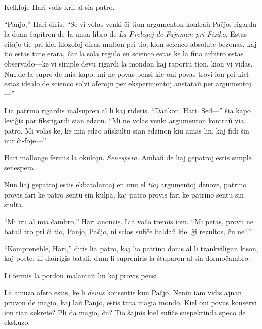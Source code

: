 Kelkfoje Hari volis krii al sia patro.

“Panjo,” Hari diris.
“Se vi volas venki ĉi tiun argumenton kontraŭ Paĉjo, rigardu la duan ĉapitron de la unua libro de \emph{La Prelegoj de Fajnman pri Fiziko}.
Estas citaĵo tie pri kiel filozofoj diras multon pri tio, kion scienco absolute bezonas, kaj tio estas tute erara, ĉar la sola regulo en scienco estas ke la fina arbitro estas observado—ke vi simple devu rigardi la mondon kaj raportu tion, kion vi vidas.
Nu…de la supro de mia kapo, mi ne povas pensi kie oni povas trovi ion pri kiel estas idealo de scienco solvi aferojn per eksperimentoj anstataŭ per argumentoj—”

Lia patrino rigardis malsupren al li kaj ridetis.
“Dankon, Hari.
Sed—” ŝia kapo leviĝis por fiksrigardi sian edzon.
“Mi ne volas venki argumenton kontraŭ via patro.
Mi volas ke, ke mia edzo aŭskultu sian edzinon kiu amas lin, kaj fidi ŝin nur ĉi-foje—”

Hari mallonge fermis la okulojn.
\emph{Senespera.}
Ambaŭ de liaj gepatroj estis simple senespera.

Nun liaj gepatroj estis ekbatalantaj en unu el \emph{tiaj} argumentoj denove, patrino provis fari ke patro sentu sin kulpa, kaj patro provis fari ke patrino sentu sin stulta.

“Mi iru al mia ĉambro,” Hari anoncis.
Lia voĉo tremis iom.
“Mi petas, provu ne batali tro pri ĉi tio, Panjo, Paĉjo, ni scios sufiĉe baldaŭ kiel ĝi rezultos, ĉu ne?”

“Kompreneble, Hari,” diris lia patro, kaj lia patrino donis al li trankviligan kison, kaj poste, ili daŭrigis batali, dum li supreniris la ŝtuparon al sia dormoĉambro.

Li fermis la pordon malantaŭ lin kaj provis pensi.

La amuza afero estis, ke li \emph{devus} konsentis kun Paĉjo.
Neniu iam vidis ajnan pruvon de magio, kaj laŭ Panjo, estis tuta magia mondo.
Kiel oni povus konservi ion tian sekrete?
Pli da magio, ĉu?
Tio ŝajnis kiel sufiĉe suspektinda speco de ekskuzo.



